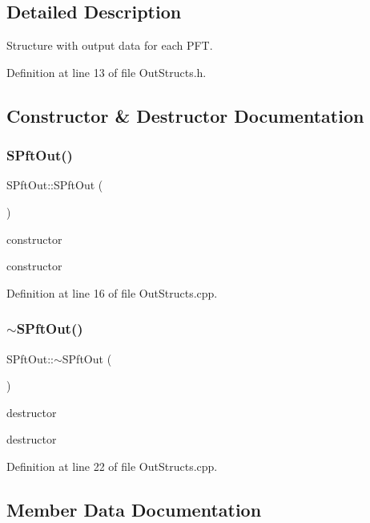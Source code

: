 \subsection{Detailed Description}
Structure with output data for each P\+FT. 

Definition at line 13 of file Out\+Structs.\+h.



\subsection{Constructor \& Destructor Documentation}
\mbox{\label{struct_s_pft_out_afeda488058fdc8fb9fa7d6b8da750e83}} 
\subsubsection{\texorpdfstring{SPftOut()}{SPftOut()}}
{\footnotesize\ttfamily S\+Pft\+Out\+::\+S\+Pft\+Out (\begin{DoxyParamCaption}{ }\end{DoxyParamCaption})}



constructor 

constructor 

Definition at line 16 of file Out\+Structs.\+cpp.

\mbox{\label{struct_s_pft_out_a56c30a87ecbd00513eac39f2c7ad8e1d}} 
\subsubsection{\texorpdfstring{$\sim$SPftOut()}{~SPftOut()}}
{\footnotesize\ttfamily S\+Pft\+Out\+::$\sim$\+S\+Pft\+Out (\begin{DoxyParamCaption}{ }\end{DoxyParamCaption})}



destructor 

destructor 

Definition at line 22 of file Out\+Structs.\+cpp.



\subsection{Member Data Documentation}
\mbox{\label{struct_s_pft_out_a9af006626f24b57e4261193f1fa17be3}} 
